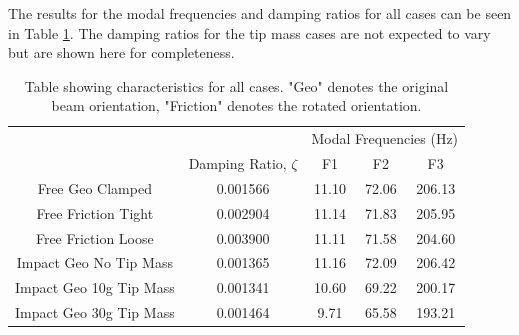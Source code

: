 \documentclass[11pt]{article}
\begin{document}
The results for the modal frequencies and damping ratios for all cases can be seen in Table \ref{tab:1res}. The damping ratios for the tip mass cases are not expected to vary but are shown here for completeness.
\begin{table}[H]
\footnotesize
\caption{Table showing characteristics for all cases. "Geo" denotes the original beam orientation, "Friction" denotes the rotated orientation.}
\centering
\begin{tabular}{|c|c|c|c|c|}
\hline
\rowcolor[HTML]{CBCEFB} 
\cellcolor[HTML]{CBCEFB}                       & \cellcolor[HTML]{CBCEFB}                                         & \multicolumn{3}{c|}{\cellcolor[HTML]{CBCEFB}Modal Frequencies (Hz)} \\ \cline{3-5} 
\rowcolor[HTML]{CBCEFB} 
\multirow{-2}{*}{\cellcolor[HTML]{CBCEFB}Case} & \multirow{-2}{*}{\cellcolor[HTML]{CBCEFB}Damping Ratio, $\zeta$} & F1                   & F2                   & F3                    \\ \hline
Free Geo Clamped                               & 0.001566                                                         & 11.10                & 72.06                & 206.13                \\ \hline
Free Friction Tight                            & 0.002904                                                        & 11.14                & 71.83                & 205.95                \\ \hline
Free Friction Loose                            & 0.003900                                           & 11.11                & 71.58                & 204.60                \\ \hline
Impact Geo No Tip Mass                         & 0.001365
                                                       & 11.16                & 72.09                & 206.42                \\ \hline
Impact Geo 10g Tip Mass                        & 0.001341                                                         & 10.60                & 69.22                & 200.17                \\ \hline
Impact Geo 30g Tip Mass                        & 0.001464                                                         & 9.71                 & 65.58                & 193.21                \\ \hline
\end{tabular}
\label{tab:1res}
\end{table}
\end{document}
